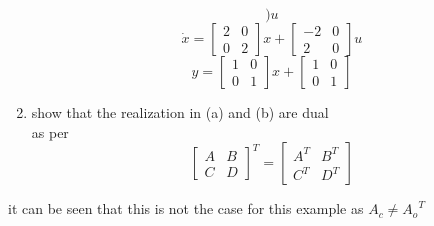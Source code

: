 \begin{enumerate}
\begin{equation}
      \big )u
    \end{equation}
    \begin{equation}
      \dot x =
      \begin{bmatrix}
        2 & 0 \\
        0 & 2
      \end{bmatrix}x +
      \begin{bmatrix}
        -2 & 0 \\
        2 & 0
      \end{bmatrix}u
    \end{equation}
    \begin{equation}
      y =
      \begin{bmatrix}
        1 & 0 \\
        0 & 1
      \end{bmatrix}x +
      \begin{bmatrix}
        1 & 0 \\
        0 & 1
      \end{bmatrix}
    \end{equation}
  \item show that the realization in (a) and (b) are dual\\
    as per
    \begin{equation}
      \begin{bmatrix}
        A & B \\
        C & D
      \end{bmatrix}^T =
      \begin{bmatrix}
        A^T & B^T \\
        C^T & D^T
      \end{bmatrix}
    \end{equation}
  \end{enumerate}
  it can be seen that this is not the case for this example as $A_c \ne {A_o}^T$